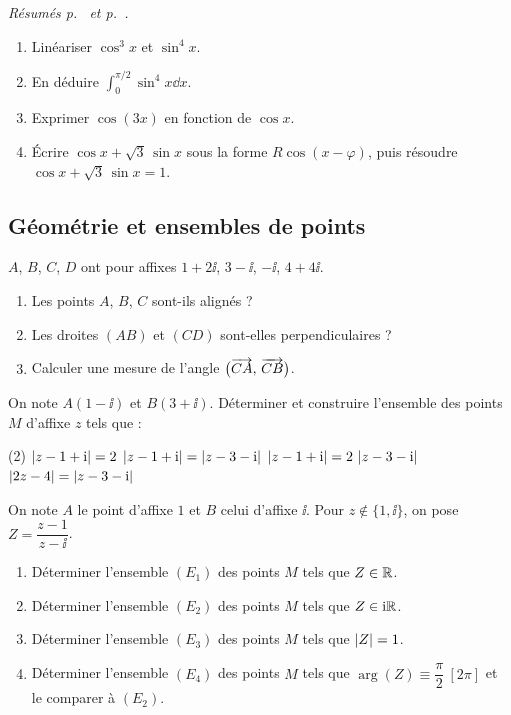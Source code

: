 \emph{Résumés p.~\pageref{res:cplx_moivre} et p.~\pageref{res:cplx_linear}.}
\begin{enumerate}
	\item Linéariser $\cos^3 x$ et $\sin^4 x$.
	\item En déduire $\displaystyle\int_0^{\pi/2}\sin^4 x\dd x$.
	\item Exprimer $\cos(3x)$ en fonction de $\cos x$.
	\item Écrire $\cos x + \sqrt3\,\sin x$ sous la forme $R\cos(x - \varphi)$,
	puis résoudre $\cos x + \sqrt3\,\sin x = 1$.
\end{enumerate}

\subsection{Géométrie et ensembles de points}

$A$, $B$, $C$, $D$ ont pour affixes $1 + 2\ii$, $3 - \ii$, $-\ii$, $4 + 4\ii$.
\begin{enumerate}
	\item Les points $A$, $B$, $C$ sont-ils alignés ?
	\item Les droites $(AB)$ et $(CD)$ sont-elles perpendiculaires ?
	\item Calculer une mesure de l'angle $\bigl(\overrightarrow{CA},\,\overrightarrow{CB}\bigr)$.
\end{enumerate}

On note $A(1 - \ii)$ et $B(3 + \ii)$. Déterminer et construire l'ensemble des
points $M$ d'affixe $z$ tels que :
\begin{listecol}(2)
	\task $\left|z - 1 + \mathrm{i}\right| = 2$
	\task $\left|z - 1 + \mathrm{i}\right| = \left|z - 3 - \mathrm{i}\right|$
	\task $\left|z - 1 + \mathrm{i}\right| = 2\,\left|z - 3 - \mathrm{i}\right|$
	\task $\left|2z - 4\right| = \left|z - 3 - \mathrm{i}\right|$
\end{listecol}

On note $A$ le point d'affixe $1$ et $B$ celui d'affixe $\ii$. Pour
$z \notin \{1, \ii\}$, on pose $Z = \dfrac{z - 1}{z - \ii}$.
\begin{enumerate}
	\item Déterminer l'ensemble $(E_1)$ des points $M$ tels que $Z \in \mathbb{R}$.
	\item Déterminer l'ensemble $(E_2)$ des points $M$ tels que $Z \in \mathrm{i}\mathbb{R}$.
	\item Déterminer l'ensemble $(E_3)$ des points $M$ tels que $\left|Z\right| = 1$.
	\item Déterminer l'ensemble $(E_4)$ des points $M$ tels que
	$\arg(Z) \equiv \dfrac{\pi}{2}\ [2\pi]$ et le comparer à $(E_2)$.
\end{enumerate}

